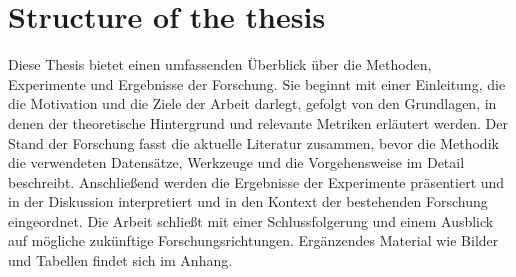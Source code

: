



\section{Structure of the thesis}


Diese Thesis bietet einen umfassenden Überblick über die Methoden, Experimente und Ergebnisse der Forschung. Sie beginnt mit einer Einleitung, die die Motivation und die Ziele der Arbeit darlegt, gefolgt von den Grundlagen, in denen der theoretische Hintergrund und relevante Metriken erläutert werden. Der Stand der Forschung fasst die aktuelle Literatur zusammen, bevor die Methodik die verwendeten Datensätze, Werkzeuge und die Vorgehensweise im Detail beschreibt. Anschließend werden die Ergebnisse der Experimente präsentiert und in der Diskussion interpretiert und in den Kontext der bestehenden Forschung eingeordnet. Die Arbeit schließt mit einer Schlussfolgerung und einem Ausblick auf mögliche zukünftige Forschungsrichtungen. Ergänzendes Material wie Bilder und Tabellen findet sich im Anhang.
